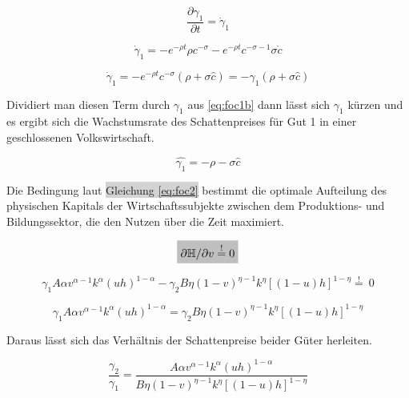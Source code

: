 	\begin{equation}
		\frac{\partial\gamma_1}{\partial t} = \dot{\gamma}_{1}
	\end{equation}


	\begin{equation*}
		\dot{\gamma}_{1} = -e^{-\rho t}\rho c^{-\sigma}-e^{-\rho t}c^{-\sigma-1}\sigma\dot{c}
	\end{equation*}

	
	\begin{equation}
		\dot{\gamma}_{1} = -e^{-\rho t}c^{-\sigma}(\rho+\sigma\hat{c}) = -\gamma_1(\rho+\sigma\hat{c})\label{eq:foc1c}
	\end{equation}


Dividiert man diesen Term durch $\gamma_1$ aus \eqref{eq:foc1b} dann lässt sich $\gamma_1$ kürzen und es ergibt sich die Wachstumsrate des Schattenpreises für Gut 1 in einer geschlossenen Volkswirtschaft.


	\begin{equation}
		\hat{\gamma_1}=-\rho-\sigma\hat{c}\label{eq:foc1d}
	\end{equation}


Die Bedingung laut \colorbox{lightgray}{Gleichung \eqref{eq:foc2}} bestimmt die optimale Aufteilung des physischen Kapitals der Wirtschaftssubjekte zwischen dem Produktions- und Bildungssektor, die den Nutzen über die Zeit maximiert.


	\begin{equation*}
		\colorbox{lightgray}{$\partial\mathbb{H}/\partial v\overset{!}{=}0$}
	\end{equation*}


	\begin{equation}
		\gamma_1A\alpha v^{\alpha-1}k^\alpha(uh)^{1-\alpha}-\gamma_2B\eta(1-v)^{\eta-1}k^\eta[(1-u)h]^{1-\eta}\overset{!}{=}~0
	\end{equation}


	\begin{equation}
		\gamma_1A\alpha v^{\alpha-1}k^\alpha(uh)^{1-\alpha}=\gamma_2B\eta(1-v)^{\eta-1}k^\eta[(1-u)h]^{1-\eta}
	\end{equation}


Daraus lässt sich das Verhältnis der Schattenpreise beider Güter herleiten.


	\begin{equation}
		\frac{\gamma_2}{\gamma_1}=\frac{A\alpha v^{\alpha-1}k^\alpha(uh)^{1-\alpha}}{B\eta(1-v)^{\eta-1}k^\eta[(1-u)h]^{1-\eta}}\label{Verhaltnisherleitung1WM}
	\end{equation}



